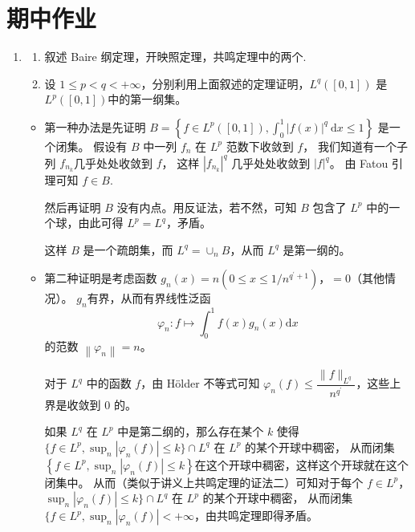 \section*{期中作业}
\begin{enumerate}
\item
\begin{enumerate}[label=(\arabic*)]
    \item 叙述 Baire 纲定理，开映照定理，共鸣定理中的两个.
    \item 设 $1 \leqslant p<q<+\infty$，分别利用上面叙述的定理证明，$L^{q}([0,1])$ 是 $L^{p}([0,1])$中的第一纲集。
\end{enumerate}
\begin{proofc}
\begin{itemize}
\item 第一种办法是先证明 $B=\left\{f \in L^{p}([0,1]), \displaystyle\int_{0}^{1}|f(x)|^{q} \mathrm{~d} x \leqslant 1\right\}$ 是一个闭集。
假设有 $B$ 中一列 $f_{n}$ 在 $L^{p}$ 范数下收敛到 $f$，
我们知道有一个子列 $f_{n_{k}}$几乎处处收敛到 $f$，
这样 $\left|f_{n_{k}}\right|^{q}$ 几乎处处收敛到 $|f|^{q}$。
由 Fatou 引理可知 $f \in B$.

然后再证明 $B$ 没有内点。用反证法，若不然，可知 $B$ 包含了 $L^{p}$ 中的一个球，由此可得 $L^{p}=L^{q}$，矛盾。

这样 $B$ 是一个疏朗集，而 $L^{q}=\cup_n B$，从而 $L^{q}$ 是第一纲的。

\item 第二种证明是考虑函数 $g_{n}(x)=n\left(0 \leqslant x \leqslant 1 / n^{q^{\prime}+1}\right)$，$=0$（其他情况）。
$g_{n}$有界，从而有界线性泛函
$$\varphi_{n}: f \mapsto \int_{0}^{1} f(x) g_{n}(x) \mathrm{d} x$$
的范数 $\left\|\varphi_{n}\right\|=n$。

对于 $L^{q}$ 中的函数 $f$，由 Hölder 不等式可知 $\varphi_{n}(f) \leqslant \dfrac{\|f\|_{L^{q}}}{n^{q^{\prime}}}$，这些上界是收敛到 $0$ 的。

如果 $L^{q}$ 在 $L^{p}$ 中是第二纲的，那么存在某个 $k$ 使得 $\{f \in L^{p}, \sup_{n}|\varphi_{n}(f)| \leqslant k\} \cap L^{q}$ 在 $L^{p}$ 的某个开球中稠密，
从而闭集 $\left\{f \in L^{p}, \sup _{n}\left|\varphi_{n}(f)\right| \leqslant k\right\}$在这个开球中稠密，这样这个开球就在这个闭集中。
从而（类似于讲义上共鸣定理的证法二）可知对于每个 $f \in L^p$，$\sup_{n}|\varphi_{n}(f)| \leqslant k\} \cap L^{q}$ 在 $L^{p}$ 的某个开球中稠密，
从而闭集 $\{f \in L^{p}, \sup _{n}\left|\varphi_{n}(f)\right|<+\infty$，由共鸣定理即得矛盾。


\end{itemize}
\end{proofc}
\end{enumerate}
